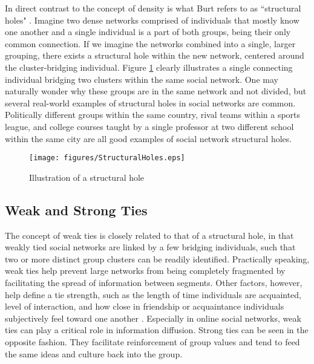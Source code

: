 {In direct contrast to the concept of density is what Burt refers to as ``structural holes" \cite{burt2009structural}. Imagine two dense networks comprised of individuals that mostly know one another and a single individual is a part of both groups, being their only common connection. If we imagine the networks combined into a single, larger grouping, there exists a structural hole within the new network, centered around the cluster-bridging individual. Figure \ref{fig:StructuralHoles} clearly illustrates a single connecting individual bridging two clusters within the same social network. One may naturally wonder why these groups are in the same network and not divided, but several real-world examples of structural holes in social networks are common. Politically different groups within the same country, rival teams within a sports league, and college courses taught by a single professor at two different school within the same city are all good examples of social network structural holes.

\begin{figure}[!htbp] \centering
  \texttt{[image: figures/StructuralHoles.eps]}
  \caption{Illustration of a structural hole}
  \label{fig:StructuralHoles}
\end{figure}

\subsection{Weak and Strong Ties}
The concept of weak ties is closely related to that of a structural hole, in that weakly tied social networks are linked by a few bridging individuals, such that two or more distinct group clusters can be readily identified. Practically speaking, weak ties help prevent large networks from being completely fragmented by facilitating the spread of information between segments. Other factors, however, help define a tie strength, such as the length of time individuals are acquainted, level of interaction, and how close in friendship or acquaintance individuals subjectively feel toward one another \cite{kadushin2012understanding}. Especially in online social networks, weak ties can play a critical role in information diffusion. Strong ties can be seen in the opposite fashion. They facilitate reinforcement of group values and tend to feed the same ideas and culture back into the group.

}
